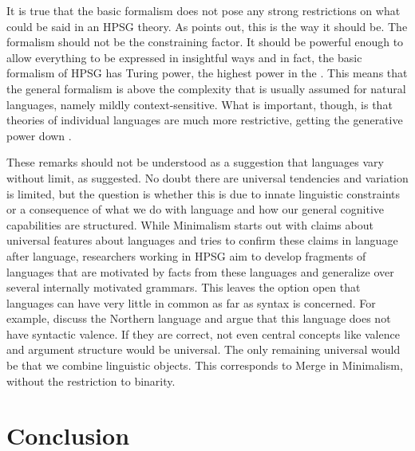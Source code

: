 \documentclass[output=paper,biblatex,babelshorthands,newtxmath,draftmode,colorlinks,citecolor=brown]{langscibook}
\begin{document}
\largerpage
It is true that
the basic formalism does not pose any strong restrictions on what could be said in an HPSG
theory. As \citet{Pollard97a} points out, this is the way it should be. The formalism should not be
the constraining factor. It should be powerful enough to allow everything to be expressed in
insightful ways and in fact, the basic formalism of HPSG has Turing power, the highest power in the
 \citep{Pollard99a}. This means that the general formalism is above the complexity that is usually
assumed for natural languages, namely mildly context-sensitive. What is important, though, is that theories of individual languages are much more
restrictive, getting the generative power down \citep[Chapter~17]{MuellerGT-Eng1}. 

These remarks should not be understood as a suggestion that languages vary without limit, as
\citet[]{Joos58a} suggested. No doubt there are universal tendencies and variation
is limited, but the question is whether this is due to innate linguistic constraints or a
consequence of what we do with language and how our general cognitive capabilities are structured. 
While Minimalism starts out with claims about universal features about languages and tries to
confirm these claims in language after language, researchers working in HPSG aim to develop
fragments of languages that are motivated by facts from these languages and generalize over several
internally motivated grammars. This leaves the option open that languages can have very little in
common as far as syntax is concerned. For example, \citet{KM2012a} discuss the Northern  language  and argue that this language
does not have syntactic valence. If they are correct, not even central concepts like valence and
argument structure would be universal. The only remaining universal would be that we combine
linguistic objects. This corresponds to Merge in Minimalism, without the restriction to binarity.


\section{Conclusion}
\end{document}
